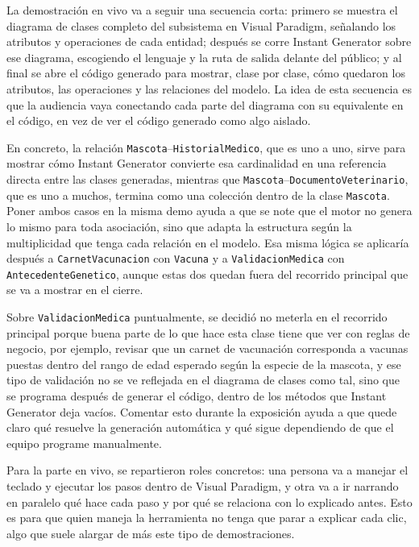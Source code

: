 \documentclass[journal,onecolumn]{IEEEtran}
\begin{document}
	La demostración en vivo va a seguir una secuencia corta: primero se muestra el diagrama de clases completo del subsistema en Visual Paradigm, señalando los atributos y operaciones de cada entidad; después se corre Instant Generator sobre ese diagrama, escogiendo el lenguaje y la ruta de salida delante del público; y al final se abre el código generado para mostrar, clase por clase, cómo quedaron los atributos, las operaciones y las relaciones del modelo. La idea de esta secuencia es que la audiencia vaya conectando cada parte del diagrama con su equivalente en el código, en vez de ver el código generado como algo aislado.
	
	En concreto, la relación \texttt{Mascota}--\texttt{HistorialMedico}, que es uno a uno, sirve para mostrar cómo Instant Generator convierte esa cardinalidad en una referencia directa entre las clases generadas, mientras que \texttt{Mascota}--\texttt{DocumentoVeterinario}, que es uno a muchos, termina como una colección dentro de la clase \texttt{Mascota}. Poner ambos casos en la misma demo ayuda a que se note que el motor no genera lo mismo para toda asociación, sino que adapta la estructura según la multiplicidad que tenga cada relación en el modelo. Esa misma lógica se aplicaría después a \texttt{CarnetVacunacion} con \texttt{Vacuna} y a \texttt{ValidacionMedica} con \texttt{AntecedenteGenetico}, aunque estas dos quedan fuera del recorrido principal que se va a mostrar en el cierre.
	
	Sobre \texttt{ValidacionMedica} puntualmente, se decidió no meterla en el recorrido principal porque buena parte de lo que hace esta clase tiene que ver con reglas de negocio, por ejemplo, revisar que un carnet de vacunación corresponda a vacunas puestas dentro del rango de edad esperado según la especie de la mascota, y ese tipo de validación no se ve reflejada en el diagrama de clases como tal, sino que se programa después de generar el código, dentro de los métodos que Instant Generator deja vacíos. Comentar esto durante la exposición ayuda a que quede claro qué resuelve la generación automática y qué sigue dependiendo de que el equipo programe manualmente.
	
	Para la parte en vivo, se repartieron roles concretos: una persona va a manejar el teclado y ejecutar los pasos dentro de Visual Paradigm, y otra va a ir narrando en paralelo qué hace cada paso y por qué se relaciona con lo explicado antes. Esto es para que quien maneja la herramienta no tenga que parar a explicar cada clic, algo que suele alargar de más este tipo de demostraciones.
	
\end{document}
